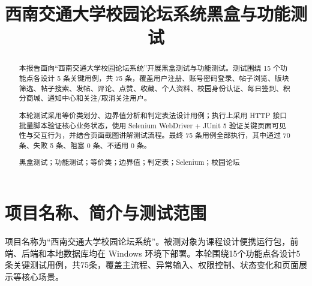 \documentclass[bwprint]{report}
\title{西南交通大学校园论坛系统黑盒与功能测试}
\begin{document}
\maketitle
\newpage

\pagestyle{plain}

\begin{abstract}
本报告面向“西南交通大学校园论坛系统”开展黑盒测试与功能测试。测试围绕 15 个功能点各设计 5 条关键用例，共 75 条，覆盖用户注册、账号密码登录、帖子浏览、版块筛选、帖子搜索、发帖、评论、点赞、收藏、个人资料、校园身份认证、每日签到、积分商城、通知中心和关注/取消关注用户。

本轮测试采用等价类划分、边界值分析和判定表法设计用例；执行上采用 HTTP 接口批量脚本验证核心业务状态，使用 Selenium WebDriver + JUnit 5 验证关键页面可见性与交互行为，并结合页面截图讲解测试流程。最终 75 条用例全部执行，其中通过 70 条、失败 5 条、阻塞 0 条、不适用 0 条。

\vspace{0.5em}
黑盒测试；功能测试；等价类；边界值；判定表；Selenium；校园论坛
\end{abstract}

\tableofcontents
\newpage
\pagestyle{plain}
\setcounter{page}{1}

\section{项目名称、简介与测试范围}
项目名称为“西南交通大学校园论坛系统”。被测对象为课程设计便携运行包，前端、后端和本地数据库均在 Windows 环境下部署。本轮围绕15个功能点各设计5条关键测试用例，共75条，覆盖主流程、异常输入、权限控制、状态变化和页面展示等核心场景。
\end{document}
